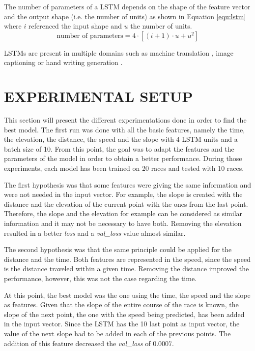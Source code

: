 \documentclass[a4paper, 10pt, conference]{ieeeconf}      %
\begin{document}
The number of parameters of a LSTM depends on the shape of the feature vector and the output shape (i.e. the number of units) as shown in Equation \ref{equ:lstm} where $i$ referenced the input shape and $u$ the number of units.
\begin{equation}
\text{number of parameters} = 4 \cdot [(i + 1) \cdot u + u^2]
\label{equ:lstm}
\end{equation}

LSTMs are present in multiple domains such as machine translation \cite{machtran}, image captioning \cite{imacaption} or hand writing generation \cite{handwrite}.

\section{EXPERIMENTAL SETUP}

This section will present the different experimentations done in order to find the best model. The first run was done with all the basic features, namely the time, the elevation, the distance, the speed and the slope with 4 LSTM units and a batch size of 10. From this point, the goal was to adapt the features and the parameters of the model in order to obtain a better performance. During those experiments, each model has been trained on 20 races and tested with 10 races.

The first hypothesis was that some features were giving the same information and were not needed in the input vector. For example, the slope is created with the distance and the elevation of the current point with the ones from the last point. Therefore, the slope and the elevation for example can be considered as similar information and it may not be necessary to have both. Removing the elevation resulted in a better \textit{loss} and a \textit{val\_loss} value almost similar.

The second hypothesis was that the same principle could be applied for the distance and the time. Both features are represented in the speed, since the speed is the distance traveled within a given time. Removing the distance improved the performance, however, this was not the case regarding the time.

At this point, the best model was the one using the time, the speed and the slope as features. Given that the slope of the entire course of the race is known, the slope of the next point, the one with the speed being predicted, has been added in the input vector. Since the LSTM has the 10 last point as input vector, the value of the next slope had to be added in each of the previous points. The addition of this feature decreased the \textit{val\_loss} of $0.0007$.
\end{document}
